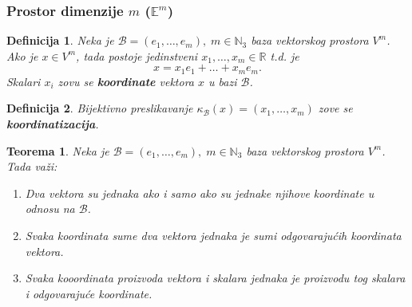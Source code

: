\documentclass[a4paper,12pt,twoside]{report}
\newtheorem{theorem}{Teorema}[section]
\newtheorem{definition}{Definicija}[section]
\numberwithin{algorithm}{section}
\begin{document}
\subsubsection*{Prostor dimenzije $m$ ($\mathbb{E}^m$)}

\begin{definition}
    Neka je $\mathcal{B} = (e_1, \dots, e_m), \; m \in \mathbb{N}_3$ baza vektorskog prostora $V^m$. Ako je $x \in V^m$, tada postoje jedinstveni $x_1, \dots, x_m \in \mathbb{R}$ t.d. je \[x = x_1e_1 + \dots + x_me_m.\]
    Skalari $x_i$ zovu se \textbf{koordinate} vektora $x$ u bazi $\mathcal{B}$.
\end{definition}

\begin{definition}
    Bijektivno preslikavanje $\kappa_\mathcal{B}(x) = (x_1, \dots, x_m)$ zove se \textbf{koordinatizacija}.
    \label{koordinatizacija1}
\end{definition}
\begin{theorem}
    Neka je $\mathcal{B} = (e_1, \dots, e_m),\; m\in \mathbb{N}_3$ baza vektorskog prostora $V^m$. Tada važi:
    \begin{enumerate}
        \item Dva vektora su jednaka ako i samo ako su jednake njihove koordinate u odnosu na $\mathcal{B}$.
        \item Svaka koordinata sume dva vektora jednaka je sumi odgovarajućih koordinata vektora.
        \item Svaka kooordinata proizvoda vektora i skalara jednaka je proizvodu tog skalara i odgovarajuće koordinate.
    \end{enumerate}
\end{theorem}
\newpage
\end{document}
